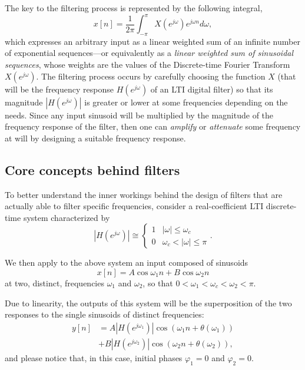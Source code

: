 \documentclass[\documentfontsize, twocolumn]{\classname}
\begin{document}
The key to the filtering process is represented by the following integral,
\begin{equation}\label{eqn:filteringProcess}
    x[n] = \frac 1 {2\pi} \int_{-\pi}^\pi X(e^{j\omega})e^{j\omega n}d\omega,
\end{equation}
which expresses an arbitrary input as a linear weighted sum of an infinite number of exponential sequences---or equivalently as a \emph{linear weighted sum of sinusoidal sequences}, whose weights are the values of the Discrete-time Fourier Transform $X(e^{j\omega})$. The filtering process occurs by carefully choosing the function $X$ (that will be the frequency response $H(e^{j\omega})$ of an LTI digital filter) so that its magnitude $\left|H(e^{j\omega})\right|$ is greater or lower at some frequencies depending on the needs. Since any input sinusoid will be multiplied by the magnitude of the frequency response of the filter, then one can \emph{amplify} or \emph{attenuate} some frequency at will by designing a suitable frequency response.

\subsection{Core concepts behind filters}

To better understand the inner workings behind the design of filters that are actually able to filter specific frequencies, consider a real-coefficient LTI discrete-time system characterized by
\begin{equation}\label{exa:idealFilter1}
    \left|H(e^{j\omega})\right| \cong
    \left\{
        \begin{array}{ll}
            1 & |\omega| \leq \omega_c\\
            0 & \omega_c < |\omega| \leq \pi
        \end{array}
    \right..
\end{equation}

We then apply to the above system an input composed of sinusoids
\[
    x[n] = A\cos{\omega_1 n} + B\cos{\omega_2 n}
\]
at two, distinct, frequencies $\omega_1$ and $\omega_2$, so that $0 < \omega_1 < \omega_c < \omega_2 < \pi$.

Due to linearity, the outputs of this system will be the superposition of the two responses to the single sinusoids of distinct frequencies:
\begin{align*}
    y[n] &=
        A\left|H(e^{j\omega_1})\right|\cos{(\omega_1 n + \theta(\omega_1))} \\
        &+ B\left|H(e^{j\omega_2})\right|\cos{(\omega_2 n + \theta(\omega_2))},
\end{align*}
and please notice that, in this case, initial phases $\varphi_1 = 0$ and $\varphi_2=0$.
\end{document}

